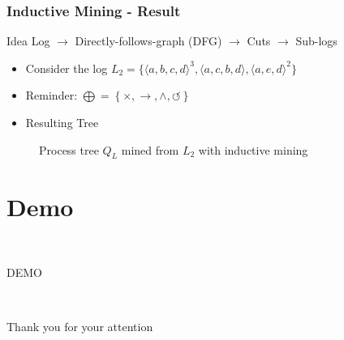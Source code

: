 \documentclass[18pt]{beamer}
\begin{document}
\begin{frame}
    \frametitle{Inductive Mining - Result} 
\begin{block}{Idea}
Log $\rightarrow$ Directly-follows-graph (DFG) $\rightarrow$ Cuts $\rightarrow$ Sub-logs
\end{block}
\begin{itemize}
	\item Consider the log $L_2 = \{ \langle a,b,c,d \rangle^3, \langle a,c,b,d \rangle, \langle a,e,d \rangle^2 \}$
	\item Reminder: $\bigoplus = \left\{ \times, \rightarrow, \wedge, \circlearrowleft \right\}$
	\item Resulting Tree
\end{itemize}

\begin{figure}[h!]
    \centering
\caption{ Process tree $Q_L$ mined from $L_2$ with inductive mining}
\label{fig:mined_tree}
\end{figure}

\end{frame}

\section{Demo} %
\label{sec:demo}

\begin{frame}{~}
	\begin{center}
		\huge{DEMO}
	\end{center}
\end{frame}

\begin{frame}{~}
	\begin{center}
		\huge{Thank you for your attention}
	\end{center}
\end{frame}
\end{document}
